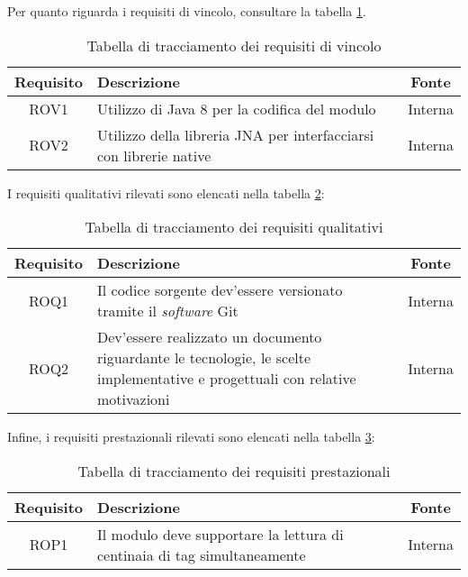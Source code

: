 Per quanto riguarda i requisiti di vincolo, consultare la tabella \ref{tab:requisiti-vinc}.
\begin{table}[!htb]
    \begin{tabularx}{\textwidth}{ | c | X | c |}
    \hline
    \textbf{Requisito} & \textbf{Descrizione} & \textbf{Fonte}\\
    \hline
    ROV1 & Utilizzo di Java 8 per la codifica del modulo & Interna \\
    \hline
    ROV2 & Utilizzo della libreria JNA per interfacciarsi con librerie native & Interna \\
    \hline
    \end{tabularx}
    \caption{Tabella di tracciamento dei requisiti di vincolo}
    \label{tab:requisiti-vinc}
\end{table}
I requisiti qualitativi rilevati sono elencati nella tabella \ref{tab:requisiti-qual}:
\begin{table}[!htb]
    \begin{tabularx}{\textwidth}{ | c | X | c |}
    \hline
    \textbf{Requisito} & \textbf{Descrizione} & \textbf{Fonte}\\
    \hline
    ROQ1 & Il codice sorgente dev'essere versionato tramite il \emph{software} Git & Interna \\
    \hline
    ROQ2 & Dev'essere realizzato un documento riguardante le tecnologie, le scelte implementative e progettuali con relative motivazioni & Interna \\
    \hline
    \end{tabularx}
    \caption{Tabella di tracciamento dei requisiti qualitativi}
    \label{tab:requisiti-qual}
\end{table}
Infine, i requisiti prestazionali rilevati sono elencati nella tabella \ref{tab:requisiti-pre}:
\begin{table}[!htb]
    \begin{tabularx}{\textwidth}{ | c | X | c |}
    \hline
    \textbf{Requisito} & \textbf{Descrizione} & \textbf{Fonte}\\
    \hline
    ROP1 & Il modulo deve supportare la lettura di centinaia di tag simultaneamente & Interna \\
    \hline
    \end{tabularx}
    \caption{Tabella di tracciamento dei requisiti prestazionali}
    \label{tab:requisiti-pre}
\end{table}
